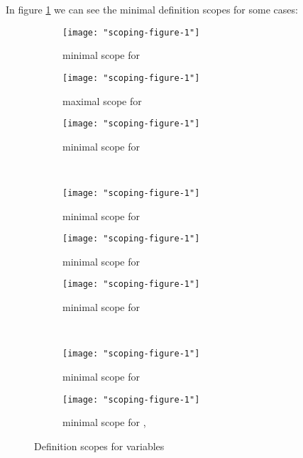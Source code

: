 	In figure \ref{fig:1} we can see the minimal definition scopes for some cases:
	\begin{figure}[ht]
	\centering
		\begin{subfigure}[b]{0.28\textwidth}
			\texttt{[image: "scoping-figure-1"]}
			\caption{\tiny minimal scope for }
		\end{subfigure}
		\begin{subfigure}[b]{0.28\textwidth}
			\texttt{[image: "scoping-figure-1"]}
			\caption{\tiny maximal scope for }
		\end{subfigure}
		\begin{subfigure}[b]{0.28\textwidth}
			\texttt{[image: "scoping-figure-1"]}
			\caption{\tiny minimal scope for }
		\end{subfigure}
		\\
		\begin{subfigure}[b]{0.28\textwidth}
			\texttt{[image: "scoping-figure-1"]}
			\caption{\tiny minimal scope for }
		\end{subfigure}
		\begin{subfigure}[b]{0.28\textwidth}
			\texttt{[image: "scoping-figure-1"]}
			\caption{\tiny minimal scope for }
		\end{subfigure}
		\begin{subfigure}[b]{0.28\textwidth}
			\texttt{[image: "scoping-figure-1"]}
			\caption{\tiny minimal scope for }
		\end{subfigure}
		\\
		\begin{subfigure}[b]{0.33\textwidth}
			\texttt{[image: "scoping-figure-1"]}
			\caption{\tiny minimal scope for }
		\end{subfigure}
		\begin{subfigure}[b]{0.33\textwidth}
			\texttt{[image: "scoping-figure-1"]}
			\caption{\tiny minimal scope for ,}
		\end{subfigure}
		\caption{Definition scopes for variables}
		\label{fig:1}
	\end{figure}
	
